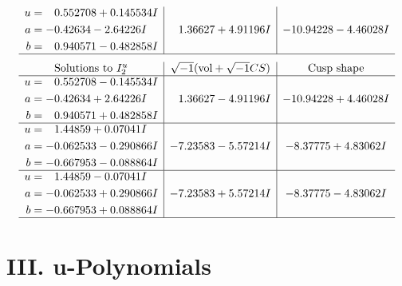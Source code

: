 \documentclass[1p]{elsarticle_modified}
\theoremstyle{definition}
\newcommand{\I}{\sqrt{-1}}
\begin{document}
$$\begin{array}{c|c|c}
\begin{aligned}
u &= \phantom{-}0.552708 + 0.145534 I \\
a &= -0.42634 - 2.64226 I \\
b &= \phantom{-}0.940571 - 0.482858 I\end{aligned}
 & \phantom{-}1.36627 + 4.91196 I & -10.94228 - 4.46028 I\\
 \hline 
 \end{array}$$\newpage$$\begin{array}{c|c|c}  
\text{Solutions to }I^u_{2}& \I (\text{vol} + \sqrt{-1}CS) & \text{Cusp shape}\\
 \hline 
\begin{aligned}
u &= \phantom{-}0.552708 - 0.145534 I \\
a &= -0.42634 + 2.64226 I \\
b &= \phantom{-}0.940571 + 0.482858 I\end{aligned}
 & \phantom{-}1.36627 - 4.91196 I & -10.94228 + 4.46028 I \\ \hline\begin{aligned}
u &= \phantom{-}1.44859 + 0.07041 I \\
a &= -0.062533 - 0.290866 I \\
b &= -0.667953 - 0.088864 I\end{aligned}
 & -7.23583 - 5.57214 I & -8.37775 + 4.83062 I \\ \hline\begin{aligned}
u &= \phantom{-}1.44859 - 0.07041 I \\
a &= -0.062533 + 0.290866 I \\
b &= -0.667953 + 0.088864 I\end{aligned}
 & -7.23583 + 5.57214 I & -8.37775 - 4.83062 I\\
 \hline 
 \end{array}$$\newpage
\newpage\renewcommand{\arraystretch}{1}
\centering \section*{ III. u-Polynomials}
\end{document}
